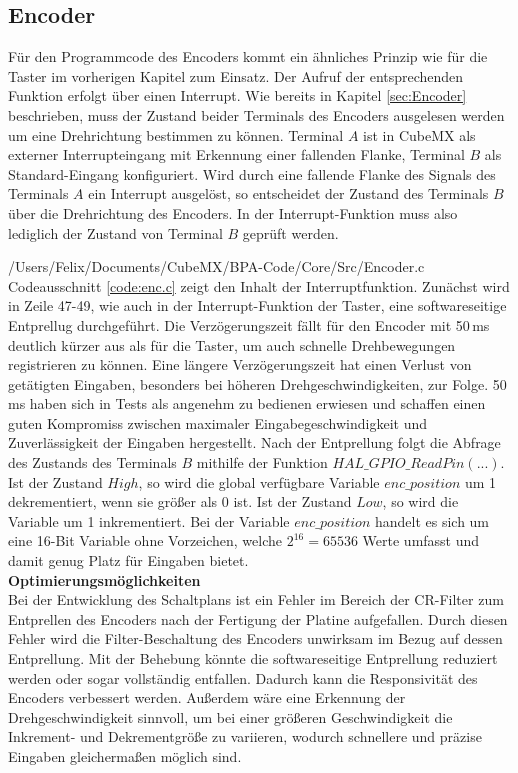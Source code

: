 
\subsection{Encoder}
Für den Programmcode des Encoders kommt ein ähnliches Prinzip wie für die Taster im vorherigen Kapitel zum Einsatz. Der Aufruf der entsprechenden Funktion erfolgt über einen Interrupt.
Wie bereits in Kapitel \ref{sec:Encoder} beschrieben, muss der Zustand beider Terminals des Encoders ausgelesen werden um eine Drehrichtung bestimmen zu können. Terminal $A$ ist in CubeMX als externer Interrupteingang mit Erkennung einer fallenden Flanke, Terminal $B$ als Standard-Eingang konfiguriert. Wird durch eine fallende Flanke des Signals des Terminals $A$ ein Interrupt ausgelöst, so entscheidet der Zustand des Terminals $B$ über die Drehrichtung des Encoders. In der Interrupt-Funktion muss also lediglich der Zustand von Terminal $B$ geprüft werden. 

{/Users/Felix/Documents/CubeMX/BPA-Code/Core/Src/Encoder.c}
Codeausschnitt \ref{code:enc.c} zeigt den Inhalt der Interruptfunktion. Zunächst wird in Zeile 47-49, wie auch in der Interrupt-Funktion der Taster, eine softwareseitige Entprellug durchgeführt. Die Verzögerungszeit fällt für den Encoder mit 50\,ms deutlich kürzer aus als für die Taster, um auch schnelle Drehbewegungen registrieren zu können. Eine längere Verzögerungszeit hat einen Verlust von getätigten Eingaben, besonders bei höheren Drehgeschwindigkeiten, zur Folge. 50\,ms haben sich in Tests als angenehm zu bedienen erwiesen und schaffen einen guten Kompromiss zwischen maximaler Eingabegeschwindigkeit und Zuverlässigkeit der Eingaben hergestellt.
Nach der Entprellung folgt die Abfrage des Zustands des Terminals $B$ mithilfe der Funktion $HAL\_GPIO\_ReadPin(...)$. Ist der Zustand $High$, so wird die global verfügbare Variable $enc\_position$ um 1 dekrementiert, wenn sie größer als 0 ist. Ist der Zustand $Low$, so wird die Variable um 1 inkrementiert. Bei der Variable $enc\_position$ handelt es sich um eine 16-Bit Variable ohne Vorzeichen, welche $2^{16} = 65536$ Werte umfasst und damit genug Platz für Eingaben bietet.\\
\newline
\textbf{Optimierungsmöglichkeiten}\\
Bei der Entwicklung des Schaltplans ist ein Fehler im Bereich der CR-Filter zum Entprellen des Encoders nach der Fertigung der Platine aufgefallen. Durch diesen Fehler wird die Filter-Beschaltung des Encoders unwirksam im Bezug auf dessen Entprellung. Mit der Behebung könnte die softwareseitige Entprellung reduziert werden oder sogar vollständig entfallen. Dadurch kann die Responsivität des Encoders verbessert werden.
Außerdem wäre eine Erkennung der Drehgeschwindigkeit sinnvoll, um bei einer größeren Geschwindigkeit die Inkrement- und Dekrementgröße zu variieren, wodurch schnellere und präzise Eingaben gleichermaßen möglich sind.